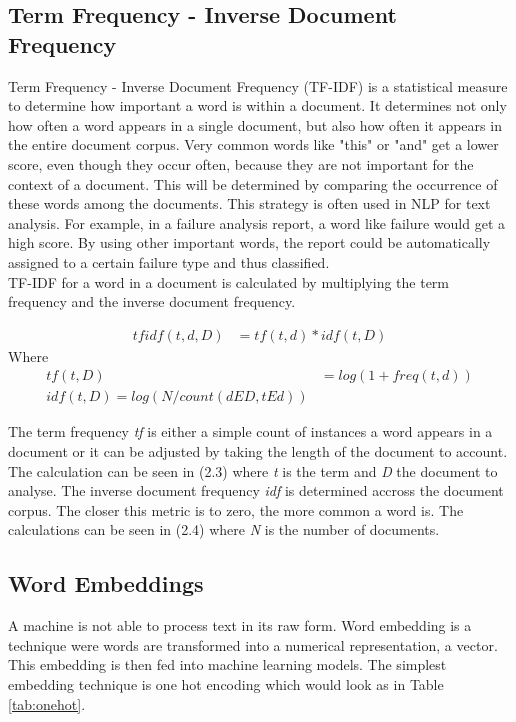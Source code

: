 \subsection{Term Frequency - Inverse Document Frequency}
Term Frequency - Inverse Document Frequency (TF-IDF) is a statistical measure to determine how important a word is within a document. It determines not only how often a word appears in a single document, but also how often it appears in the entire document corpus. Very common words like "this" or "and" get a lower score, even though they occur often, because they are not important for the context of a document. This will be determined by comparing the occurrence of these words among the documents. This strategy is often used in NLP for text analysis. For example, in a failure analysis report, a word like failure would get a high score. By using other important words, the report could be automatically assigned to a certain failure type and thus classified. \\
TF-IDF for a word in a document is calculated by multiplying the term frequency and the inverse document frequency.

\begin{align}
	tf idf (t, d, D) &= tf(t, d) * idf(t, D)
\end{align}
Where
\begin{align}
	tf (t, D) &= log(1 + freq(t, d)) \\
	idf(t, D) = log(N/count(d E D, t E d))
\end{align}

The term frequency \textit{tf} is either a simple count of instances a word appears in a document or it can be adjusted by taking the length of the document to account. The calculation can be seen in (2.3) where \textit{t} is the term and \textit{D} the document to analyse. The inverse document frequency \textit{idf} is determined accross the document corpus. The closer this metric is to zero, the more common a word is. The calculations can be seen in (2.4) where \textit{N} is the number of documents.

\subsection{Word Embeddings}
A machine is not able to process text in its raw form. Word embedding is a technique were words are transformed into a numerical representation, a vector. This embedding is then fed into machine learning models. The simplest embedding technique is one hot encoding which would look as in Table \ref{tab:onehot}.

